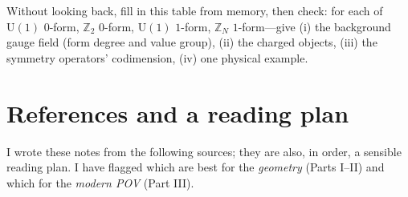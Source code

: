 \documentclass[11pt]{article}
\newcommand{\Uone}{\mathrm{U}(1)}
\newcommand{\Ztwo}{\mathbb{Z}_2}
\newcommand{\ZN}{\mathbb{Z}_N}
\begin{document}
\begin{xca}
Without looking back, fill in this table from memory, then check: for each of
$\Uone$ $0$-form, $\Ztwo$ $0$-form, $\Uone$ $1$-form, $\ZN$ $1$-form---give (i) the
background gauge field (form degree and value group), (ii) the charged objects,
(iii) the symmetry operators' codimension, (iv) one physical example.
\end{xca}

\section*{References and a reading plan}

\noindent
I wrote these notes from the following sources; they are also, in order, a sensible
reading plan. I have flagged which are best for the \emph{geometry} (Parts I--II) and
which for the \emph{modern POV} (Part III).
\sloppy
\end{document}
